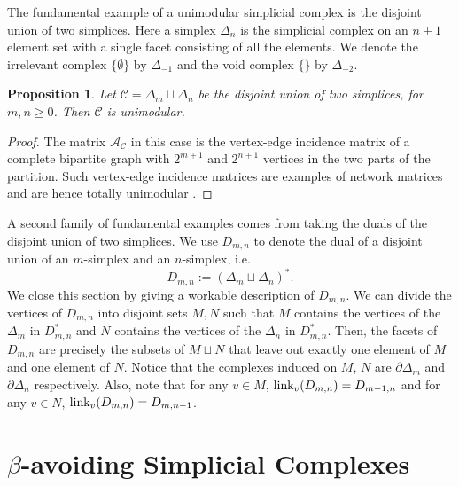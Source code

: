 \documentclass[letterpaper,12pt]{amsart}
\theoremstyle{plain}
\newtheorem{prop}[thm]{Proposition}
\theoremstyle{definition}
\theoremstyle{remark}
\newcommand{\calc}{\mathcal{C}}
\newcommand{\link}{\textnormal{link}}
\begin{document}
The fundamental example of a unimodular simplicial complex is the disjoint union of two simplices.
Here a simplex $\Delta_n$ is the simplicial complex on an $n+1$ element set with
a single facet consisting of all the elements.
We denote the irrelevant complex $\{\emptyset\}$ by $\Delta_{-1}$ and the void complex $\{\}$ by $\Delta_{-2}$.

\begin{prop}\label{disjointsimplices}
	Let $\mathcal{C} = \Delta_m \sqcup \Delta_n$ be the disjoint union of two simplices, for
	$m, n \geq 0$.
	Then $\mathcal{C}$ is unimodular.
\end{prop}

\begin{proof}
The matrix $\mathcal{A}_\calc$ in this case is the vertex-edge incidence matrix
of a complete bipartite graph with $2^{m+1}$ and $2^{n+1}$ vertices in the two
parts of the partition.  Such  vertex-edge incidence matrices are
examples of network matrices and are hence totally unimodular
\cite[Ch.~19]{Schrijver1986}.
\end{proof}

A second family of fundamental examples comes from taking the duals of
the disjoint union of two simplices.
We use $D_{m,n}$ to denote the dual of a disjoint union of an $m$-simplex 
and an $n$-simplex, i.e.
\[
	D_{m,n} := (\Delta_m \sqcup \Delta_n)^*.
\]
We close this section by giving a workable description of $D_{m,n}$.
We can divide the vertices of $D_{m,n}$ into disjoint sets $M,N$ such that
$M$ contains the vertices of the $\Delta_m$ in $D_{m,n}^*$ and $N$ contains the vertices of the $\Delta_n$ in $D_{m,n}^*$.
Then, the facets of $D_{m,n}$ are precisely the subsets of $M \sqcup N$ that leave out exactly one element of
$M$ and one element of $N$.
Notice that the complexes induced on $M$, $N$ are $\partial\Delta_m$ and $\partial\Delta_n$ respectively.
Also, note that for any $v \in M$, $\link_{v}(D_{m,n}) = D_{m-1,n}$ and for any $v \in N$, $\link_{v}(D_{m,n}) = D_{m,n-1}$.






\section{$\beta$-avoiding Simplicial Complexes}\label{sec:bavoid}
\end{document}
